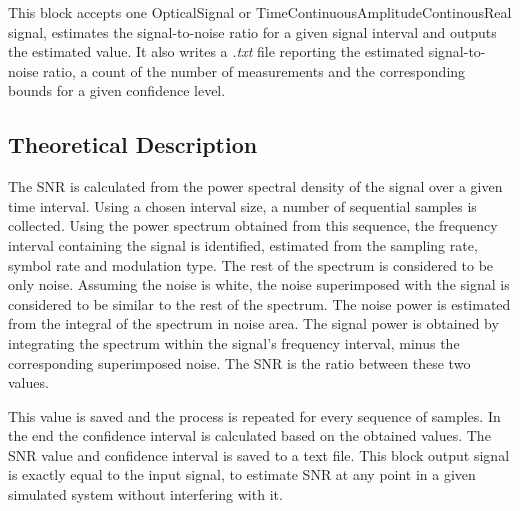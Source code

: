 This block accepts one OpticalSignal or TimeContinuousAmplitudeContinousReal signal, estimates the signal-to-noise ratio for a given signal interval and outputs the estimated value. It also writes a \textit{.txt} file reporting the estimated signal-to-noise ratio, a count of the number of measurements and the corresponding bounds for a given confidence level.

\subsection*{Theoretical Description}\label{snrcalc}
The SNR is calculated from the power spectral density of the signal over a given time interval. Using a chosen interval size, a number of sequential samples is collected. Using the power spectrum obtained from this sequence, the frequency interval containing the signal is identified, estimated from the sampling rate, symbol rate and modulation type. The rest of the spectrum is considered to be only noise.
Assuming the noise is white, the noise superimposed with the signal is considered to be similar to the rest of the spectrum. The noise power is estimated from the integral of the spectrum in noise area. The signal power is obtained by integrating the spectrum within the signal's frequency interval, minus the corresponding superimposed noise. The SNR is the ratio between these two values. 

This value is saved and the process is repeated for every sequence of samples. In the end the confidence interval is calculated based on the obtained values. The SNR value and confidence interval is saved to a text file.
This block output signal is exactly equal to the input signal, to estimate SNR at any point in a given simulated system without interfering with it.









 